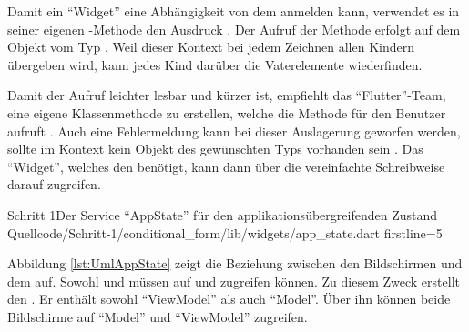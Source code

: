Damit ein \enquote{Widget} eine Abhängigkeit von dem  anmelden kann, verwendet es in seiner eigenen -Methode den Ausdruck .
Der Aufruf der Methode erfolgt auf dem Objekt vom Typ .
Weil dieser Kontext bei jedem Zeichnen allen Kindern übergeben wird, kann jedes Kind darüber die Vaterelemente wiederfinden.

Damit der Aufruf leichter lesbar und kürzer ist, empfiehlt das \enquote{Flutter}-Team, eine eigene Klassenmethode zu erstellen, welche die Methode für den Benutzer aufruft .
Auch eine Fehlermeldung kann bei dieser Auslagerung geworfen werden, sollte im Kontext kein Objekt des gewünschten Typs vorhanden sein .
Das \enquote{Widget}, welches den  benötigt, kann dann über die vereinfachte Schreibweise  darauf zugreifen.

\begin{alexlisting}{Schritt 1}{Der Service \enquote{AppState} für den applikationsübergreifenden Zustand}
  {Quellcode/Schritt-1/conditional_form/lib/widgets/app_state.dart}
  {firstline=5}
  \label{lst:Schritt1DerServiceAppState}
\end{alexlisting}


Abbildung \ref{lst:UmlAppState} zeigt die Beziehung zwischen den Bildschirmen und dem  auf.
Sowohl  und  müssen auf  und  zugreifen können.
Zu diesem Zweck erstellt  den .
Er enthält sowohl \enquote{ViewModel} als auch \enquote{Model}.
Über ihn können beide Bildschirme auf \enquote{Model} und \enquote{ViewModel} zugreifen.





